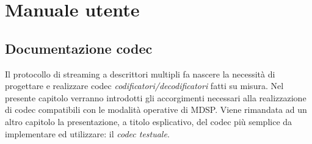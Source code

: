 \chapter{Manuale utente}
\section{Documentazione codec}
Il protocollo di streaming a descrittori multipli fa nascere la necessit\`a di progettare e realizzare codec \emph{codificatori/decodificatori} fatti su misura. Nel presente capitolo verranno introdotti gli accorgimenti necessari alla realizzazione di codec compatibili con le modalit\`a operative di MDSP. Viene rimandata ad un altro capitolo la presentazione, a titolo esplicativo, del codec pi\`u semplice da implementare ed utilizzare: il \emph{codec testuale}.

